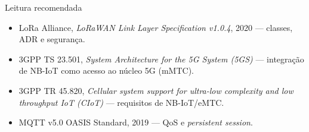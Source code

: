 \documentclass[aspectratio=169,11pt]{beamer}
\begin{document}
\begin{frame}{Leitura recomendada}
  \begin{itemize}
    \item LoRa Alliance, \emph{LoRaWAN Link Layer Specification v1.0.4}, 2020 --- classes, ADR e segurança.
    \item 3GPP TS 23.501, \emph{System Architecture for the 5G System (5GS)} --- integração de NB-IoT como acesso ao núcleo 5G (mMTC).
    \item 3GPP TR 45.820, \emph{Cellular system support for ultra-low complexity and low throughput IoT (CIoT)} --- requisitos de NB-IoT/eMTC.
    \item MQTT v5.0 OASIS Standard, 2019 --- QoS e \emph{persistent session}.
  \end{itemize}
\end{frame}
\end{document}
